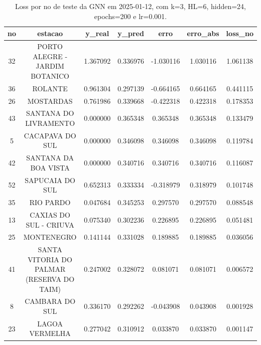 \begin{table}[h]
\centering
\caption{Loss por no de teste da GNN em 2025-01-12, com k=3, HL=6, hidden=24, epochs=200 e lr=0.001.}
\label{tab:gnn_loss_k3_hl6_h24_e200_d20250112}
\begin{tabular}{ccccccc}
\toprule
no & estacao & y\_real & y\_pred & erro & erro\_abs & loss\_no \\
\midrule
32 & PORTO ALEGRE - JARDIM BOTANICO & 1.367092 & 0.336976 & -1.030116 & 1.030116 & 1.061138 \\
36 & ROLANTE & 0.961304 & 0.297139 & -0.664165 & 0.664165 & 0.441115 \\
26 & MOSTARDAS & 0.761986 & 0.339668 & -0.422318 & 0.422318 & 0.178353 \\
43 & SANTANA DO LIVRAMENTO & 0.000000 & 0.365348 & 0.365348 & 0.365348 & 0.133479 \\
5 & CACAPAVA DO SUL & 0.000000 & 0.346098 & 0.346098 & 0.346098 & 0.119784 \\
42 & SANTANA DA BOA VISTA & 0.000000 & 0.340716 & 0.340716 & 0.340716 & 0.116087 \\
52 & SAPUCAIA DO SUL & 0.652313 & 0.333334 & -0.318979 & 0.318979 & 0.101748 \\
35 & RIO PARDO & 0.047684 & 0.345253 & 0.297570 & 0.297570 & 0.088548 \\
13 & CAXIAS DO SUL - CRIUVA & 0.075340 & 0.302236 & 0.226895 & 0.226895 & 0.051481 \\
25 & MONTENEGRO & 0.141144 & 0.331028 & 0.189885 & 0.189885 & 0.036056 \\
41 & SANTA VITORIA DO PALMAR (RESERVA DO TAIM) & 0.247002 & 0.328072 & 0.081071 & 0.081071 & 0.006572 \\
8 & CAMBARA DO SUL & 0.336170 & 0.292262 & -0.043908 & 0.043908 & 0.001928 \\
23 & LAGOA VERMELHA & 0.277042 & 0.310912 & 0.033870 & 0.033870 & 0.001147 \\
\bottomrule
\end{tabular}
\end{table}
